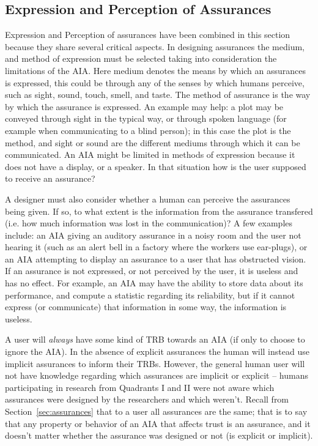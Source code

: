 \subsection{Expression and Perception of Assurances} \label{sec:express_assurances}
    Expression and Perception of assurances have been combined in this section because they share several critical aspects. In designing assurances the medium, and method of expression must be selected taking into consideration the limitations of the AIA. Here medium denotes the means by which an assurances is expressed, this could be through any of the senses by which humans perceive, such as sight, sound, touch, smell, and taste. The method of assurance is the way by which the assurance is expressed. An example may help: a plot may be conveyed through sight in the typical way, or through spoken language (for example when communicating to a blind person); in this case the plot is the method, and sight or sound are the different mediums through which it can be communicated. An AIA might be limited in methods of expression because it does not have a display, or a speaker. In that situation how is the user supposed to receive an assurance?

    A designer must also consider whether a human can perceive the assurances being given. If so, to what extent is the information from the assurance transfered (i.e. how much information was lost in the communication)? A few examples include: an AIA giving an auditory assurance in a noisy room and the user not hearing it (such as an alert bell in a factory where the workers use ear-plugs), or an AIA attempting to display an assurance to a user that has obstructed vision. If an assurance is not expressed, or not perceived by the user, it is useless and has no effect. For example, an AIA may have the ability to store data about its performance, and compute a statistic regarding its reliability, but if it cannot express (or communicate) that information in some way, the information is useless.

    A user will \emph{always} have some kind of TRB towards an AIA (if only to choose to ignore the AIA). In the absence of explicit assurances the human will instead use implicit assurances to inform their TRBs. However, the general human user will not have knowledge regarding which assurances are implicit or explicit -- humans participating in research from Quadrants I and II were not aware which assurances were designed by the researchers and which weren't. Recall from Section~\ref{sec:assurances} that to a user all assurances are the same; that is to say that any property or behavior of an AIA that affects trust is an assurance, and it doesn't matter whether the assurance was designed or not (is explicit or implicit).

